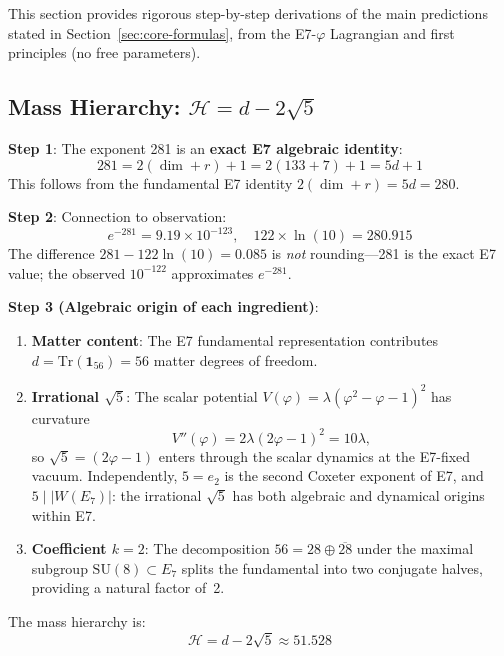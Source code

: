 \documentclass[11pt,a4paper]{article}
\begin{document}
This section provides rigorous step-by-step derivations of the main predictions stated in Section~\ref{sec:core-formulas}, from the E7-$\varphi$ Lagrangian and first principles (no free parameters).

\subsection{Mass Hierarchy: $\mathcal{H} = d - 2\sqrt{5}$}

\textbf{Step 1}: The exponent 281 is an \textbf{exact E7 algebraic identity}:
\begin{equation}
\boxed{281 = 2(\dim + r) + 1 = 2(133 + 7) + 1 = 5d + 1}
\end{equation}
This follows from the fundamental E7 identity $2(\dim + r) = 5d = 280$.

\textbf{Step 2}: Connection to observation:
\begin{equation}
e^{-281} = 9.19 \times 10^{-123}, \quad 122 \times \ln(10) = 280.915
\end{equation}
The difference $281 - 122\ln(10) = 0.085$ is \textit{not} rounding---281 is the exact E7 value; the observed $10^{-122}$ approximates $e^{-281}$.

\textbf{Step 3 (Algebraic origin of each ingredient)}:
\begin{enumerate}
\item \textbf{Matter content}: The E7 fundamental representation contributes $d = \mathrm{Tr}(\mathbf{1}_{56}) = 56$ matter degrees of freedom.
\item \textbf{Irrational $\sqrt{5}$}: The scalar potential $V(\varphi) = \lambda(\varphi^2 - \varphi - 1)^2$ has curvature
\begin{equation}
V''(\varphi) = 2\lambda(2\varphi - 1)^2 = 10\lambda,
\end{equation}
so $\sqrt{5} = (2\varphi - 1)$ enters through the scalar dynamics at the E7-fixed vacuum. Independently, $5 = e_2$ is the second Coxeter exponent of E7, and $5 \mid |W(E_7)|$: the irrational $\sqrt{5}$ has both algebraic and dynamical origins within E7.
\item \textbf{Coefficient $k = 2$}: The decomposition $56 = 28 \oplus \overline{28}$ under the maximal subgroup $\mathrm{SU}(8) \subset E_7$ splits the fundamental into two conjugate halves, providing a natural factor of~2.
\end{enumerate}

The mass hierarchy is:
\begin{equation}
\boxed{\mathcal{H} = d - 2\sqrt{5} \approx 51.528}
\end{equation}
\end{document}
